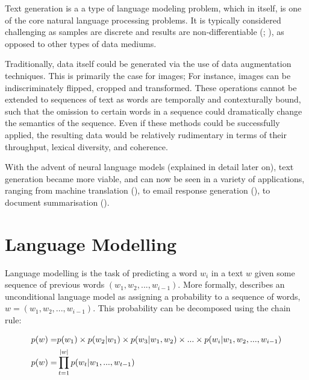 \documentclass[12pt,twoside]{report}
\begin{document}

Text generation is a a type of language modeling problem, which in itself, is one of the core natural language processing problems. It is typically considered challenging as samples are discrete and results are non-differentiable (\cite{kovalenko_controllable_2017}; \cite{kovalenko_controllable_2017-1}), as opposed to other types of data mediums. 

Traditionally, data itself could be generated via the use of data augmentation techniques. This is primarily the case for images; For instance, images can be indiscriminately flipped, cropped and transformed. These operations cannot be extended to sequences of text as words are temporally and contexturally bound, such that the omission to certain words in a sequence could dramatically change the semantics of the sequence. Even if these methods could be successfully applied, the resulting data would be relatively rudimentary in terms of their throughput, lexical diversity, and coherence.

With the advent of neural language models (explained in detail later on), text generation became more viable, and can now be seen in a variety of applications, ranging from machine translation (\cite{sutskever_sequence_2014}), to email response generation (\cite{kannan_smart_2016}), to document summarisation (\cite{nallapati_summarunner_2016}).

\section{Language Modelling}


Language modelling is the task of predicting a word $w_i$ in a text $w$ given some sequence of previous words $(w_1, w_2, ..., w_{i-1})$. More formally, \cite{dyer_conditional_2017} describes an unconditional language model as assigning a probability to a sequence of words,  $w = (w_1, w_2, ..., w_{i-1})$. This probability can be decomposed using the chain rule:

\begin{align}
p(w) =& \space p(w_1) \times p(w_2|w_1) \times p(w_3|w_1, w_2) \times ... \times p(w_i|w_1, w_2, ..., w_{i-1}) \\
p(w) =& \prod^{|w|}_{t=1}p(w_t|w_1, ..., w_{t-1})
\end{align}
\end{document}
